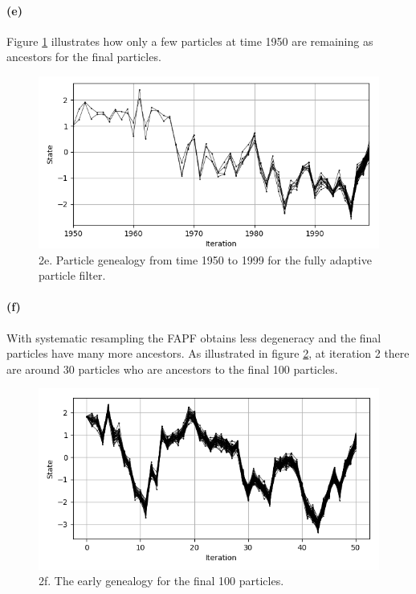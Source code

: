 \documentclass{article}
\begin{document}
\paragraph{(e)} Figure \ref{fig:2_e} illustrates how only a few particles at time 1950 are remaining as ancestors for the final particles. 
	
	\begin{figure}[h]
		\centering
		\includegraphics[width=\linewidth]{2_e}
		\caption{2e. Particle genealogy from time 1950 to 1999 for the fully adaptive particle filter.}
		\label{fig:2_e}
	\end{figure}

\paragraph{(f)} With systematic resampling the FAPF obtains less degeneracy and the final particles have many more ancestors. As illustrated in figure \ref{fig:2_f}, at iteration 2 there are around 30 particles who are ancestors to the final 100 particles.
	\begin{figure}[h]
		\centering
		\includegraphics[width=\linewidth]{2_f}
		\caption{2f. The early genealogy for the final 100 particles.}
		\label{fig:2_f}
	\end{figure}
\end{document}
